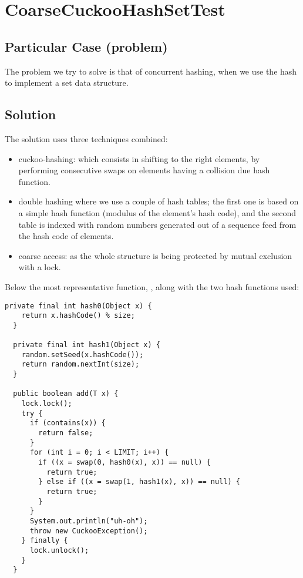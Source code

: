 \section{\textbf{CoarseCuckooHashSetTest}}

\subsection{Particular Case (problem)}
The problem we try to solve is that of concurrent hashing, when we use
the hash to implement a set data structure. 

\subsection{Solution}
The solution uses three techniques combined: \\

\begin{itemize}
  \item cuckoo-hashing: which consists in shifting to the right
    elements, by performing consecutive swaps on elements having a
    collision due hash function. \\
  \item double hashing where we use a couple of hash tables; the first
    one is based on a simple hash function (modulus of the element's
    hash code), and the second table is indexed with random numbers
    generated out of a sequence feed from the hash code of elements.
    \item coarse access: as the whole structure is being protected by
      mutual exclusion with a lock.
\end{itemize}
\hfill

Below the most representative function, , along with the two
hash functions used: \\

\begin{lstlisting}[style=numbers]
  private final int hash0(Object x) {
    return x.hashCode() % size;
  }

  private final int hash1(Object x) {
    random.setSeed(x.hashCode());
    return random.nextInt(size);
  }

  public boolean add(T x) {
    lock.lock();
    try {
      if (contains(x)) {
        return false;
      }
      for (int i = 0; i < LIMIT; i++) {
        if ((x = swap(0, hash0(x), x)) == null) {
          return true;
        } else if ((x = swap(1, hash1(x), x)) == null) {
          return true;
        }
      }
      System.out.println("uh-oh");
      throw new CuckooException();
    } finally {
      lock.unlock();
    }
  }
\end{lstlisting}
\hfill

